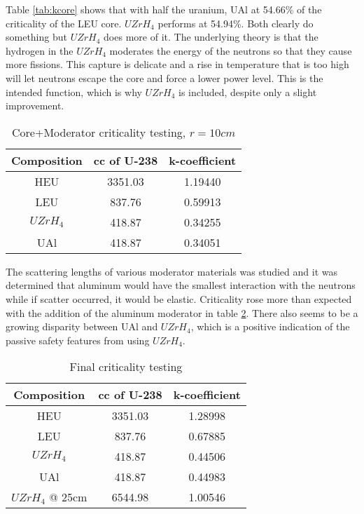 Table \ref{tab:kcore} shows that with half the uranium, UAl at 54.66\% of the criticality of the LEU core. $UZrH_4$ performs at 54.94\%. Both clearly do something but $UZrH_4$ does more of it. The underlying theory is that the hydrogen in the $UZrH_4$ moderates the energy of the neutrons so that they cause more fissions. This capture is delicate and a rise in temperature that is too high will let neutrons escape the core and force a lower power level. This is the intended function, which is why $UZrH_4$ is included, despite only a slight improvement.

\begin{table}[!htbp]
\centering
\caption{Core+Moderator criticality testing, $r=10cm$}
\label{tab:kmod}
\begin{tabular}{|c|c|c|}
\hline
Composition		& cc of U-238		& k-coefficient \\
\hline
HEU	  	        & 3351.03           & 1.19440       \\
\hline
LEU				&  837.76           & 0.59913       \\
\hline
$UZrH_4$ 		&  418.87           & 0.34255       \\
\hline
UAl 			&  418.87           & 0.34051       \\
\hline
\end{tabular}
\end{table}

The scattering lengths of various moderator materials was studied and it was determined that aluminum would have the smallest interaction with the neutrons while if scatter occurred, it would be elastic. Criticality rose more than expected with the addition of the aluminum moderator in table \ref{tab:kmod}. There also seems to be a growing disparity between UAl and $UZrH_4$, which is a positive indication of the passive safety features from using $UZrH_4$.

\begin{table}[!htbp]
\centering
\caption{Final criticality testing}
\label{tab:kmod}
\begin{tabular}{|c|c|c|}
\hline
Composition			& cc of U-238		& k-coefficient \\
\hline
HEU	  	        	& 3351.03           & 1.28998       \\
\hline
LEU					&  837.76           & 0.67885       \\
\hline
$UZrH_4$ 			&  418.87           & 0.44506       \\
\hline
UAl 				&  418.87           & 0.44983       \\
\hline
$UZrH_4$ @ 25cm 	& 6544.98           & 1.00546       \\
\hline
\end{tabular}
\end{table}


